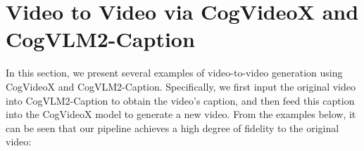 \clearpage
\section{Video to Video via CogVideoX and CogVLM2-Caption}
\label{ap:v2v}

In this section, we present several examples of video-to-video generation using CogVideoX and CogVLM2-Caption. Specifically, we first input the original video into CogVLM2-Caption to obtain the video's caption, and then feed this caption into the CogVideoX model to generate a new video. From the examples below, it can be seen that our pipeline achieves a high degree of fidelity to the original video:




